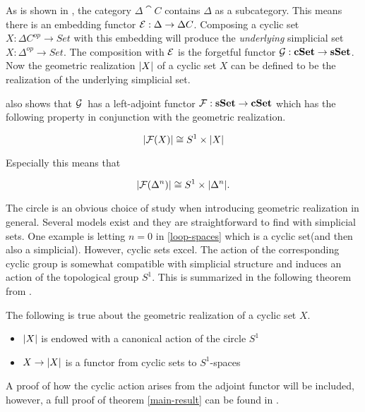 \documentclass[../../main.tex]{subfiles}
\begin{document}
    As is shown in \cite{loday-cyclic}, the category $\Delta \cat{C}$ contains $\Delta$ as a subcategory. This means there is an embedding functor $\functor{E}: \Delta \to \Delta C$. Composing a cyclic set $X: \Delta C^{op} \to Set$ with this embedding will produce the \emph{underlying} simplicial set $X: \Delta^{op} \to Set$. The composition with $\functor{E}$ is the forgetful functor $\functor{G}: \cat{cSet} \to \cat{sSet}$. Now the geometric realization $\geom[X]$ of a cyclic set $X$ can be defined to be the realization of the underlying simplicial set.

    \cite{loday-cyclic} also shows that $\functor{G}$ has a left-adjoint functor $\functor{F}: \cat{sSet} \to \cat{cSet}$ which has the following property in conjunction with the geometric realization.

    \begin{equation*}
        \geom[\functor{F}(X)] \cong S^1 \times \geom[X]
    \end{equation*}

    Especially this means that 
    
    \begin{equation}\label{loop-spaces}
        \geom[\functor{F}(\Delta^n)] \cong S^1 \times \geom[\Delta^n].
    \end{equation}

    The circle is an obvious choice of study when introducing geometric realization in general. Several models exist and they are straightforward to find with simplicial sets. One example is letting $n = 0$ in \eqref{loop-spaces} which is a cyclic set(and then also a simplicial). However, cyclic sets excel. The action of the corresponding cyclic group is somewhat compatible with simplicial structure and induces an action of the topological group $S^1$. This is summarized in the following theorem from \cite{loday-cyclic}.

    \begin{theorem}\label{main-result}
        The following is true about the geometric realization of a cyclic set $X$.
        \begin{itemize}
            \item $\geom[X]$ is endowed with a canonical action of the circle $S^1$
            \item $X \to \geom[X]$ is a functor from cyclic sets to $S^1$-spaces
        \end{itemize}
    \end{theorem}

    A proof of how the cyclic action arises from the adjoint functor will be included, however, a full proof of theorem \ref{main-result} can be found in \cite{loday-cyclic}.
\end{document}
